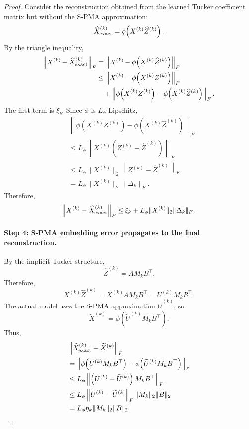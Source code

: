 \documentclass[11pt]{article}
\begin{document}
\begin{proof}
	Consider the reconstruction obtained from the learned Tucker coefficient matrix but without the S-PMA approximation:
	\[
	\widehat X_{\rm exact}^{(k)}
	=
	\phi\!\left(
	X^{(k)}\widehat Z^{(k)}
	\right).
	\]
	By the triangle inequality,
	\[
	\begin{aligned}
		\left\|
		X^{(k)}-\widehat X_{\rm exact}^{(k)}
		\right\|_F
		&=
		\left\|
		X^{(k)}
		-
		\phi\!\left(
		X^{(k)}\widehat Z^{(k)}
		\right)
		\right\|_F\\
		&\le
		\left\|
		X^{(k)}
		-
		\phi\!\left(
		X^{(k)}Z^{(k)}
		\right)
		\right\|_F\\
		&\quad+
		\left\|
		\phi\!\left(
		X^{(k)}Z^{(k)}
		\right)
		-
		\phi\!\left(
		X^{(k)}\widehat Z^{(k)}
		\right)
		\right\|_F .
	\end{aligned}
	\]
	The first term is $\xi_k$. Since $\phi$ is $L_\phi$-Lipschitz,
	\[
	\begin{aligned}
		&
		\left\|
		\phi\!\left(
		X^{(k)}Z^{(k)}
		\right)
		-
		\phi\!\left(
		X^{(k)}\widehat Z^{(k)}
		\right)
		\right\|_F\\
		&\le
		L_\phi
		\left\|
		X^{(k)}
		\left(
		Z^{(k)}-\widehat Z^{(k)}
		\right)
		\right\|_F\\
		&\le
		L_\phi
		\|X^{(k)}\|_2
		\left\|
		Z^{(k)}-\widehat Z^{(k)}
		\right\|_F\\
		&=
		L_\phi
		\|X^{(k)}\|_2
		\|\Delta_k\|_F .
	\end{aligned}
	\]
	Therefore,
	\[
	\left\|
	X^{(k)}-\widehat X_{\rm exact}^{(k)}
	\right\|_F
	\le
	\xi_k
	+
	L_\phi
	\|X^{(k)}\|_2
	\|\Delta_k\|_F .
	\]
	
	\paragraph{Step 4: S-PMA embedding error propagates to the final reconstruction.}
	By the implicit Tucker structure,
	\[
	\widehat Z^{(k)}
	=
	A M_k B^\top.
	\]
	Therefore,
	\[
	X^{(k)}\widehat Z^{(k)}
	=
	X^{(k)}A M_k B^\top
	=
	U^{(k)}M_kB^\top .
	\]
	The actual model uses the S-PMA approximation $\widetilde U^{(k)}$, so
	\[
	\widetilde X^{(k)}
	=
	\phi\!\left(
	\widetilde U^{(k)}M_kB^\top
	\right).
	\]
	Thus,
	\[
	\begin{aligned}
		&
		\left\|
		\widehat X_{\rm exact}^{(k)}
		-
		\widetilde X^{(k)}
		\right\|_F\\
		&=
		\left\|
		\phi\!\left(
		U^{(k)}M_kB^\top
		\right)
		-
		\phi\!\left(
		\widetilde U^{(k)}M_kB^\top
		\right)
		\right\|_F\\
		&\le
		L_\phi
		\left\|
		\left(
		U^{(k)}-\widetilde U^{(k)}
		\right)
		M_kB^\top
		\right\|_F\\
		&\le
		L_\phi
		\left\|
		U^{(k)}-\widetilde U^{(k)}
		\right\|_F
		\|M_k\|_2
		\|B\|_2\\
		&=
		L_\phi
		\eta_k
		\|M_k\|_2
		\|B\|_2 .
	\end{aligned}
	\]
	

\end{proof}
\end{document}
